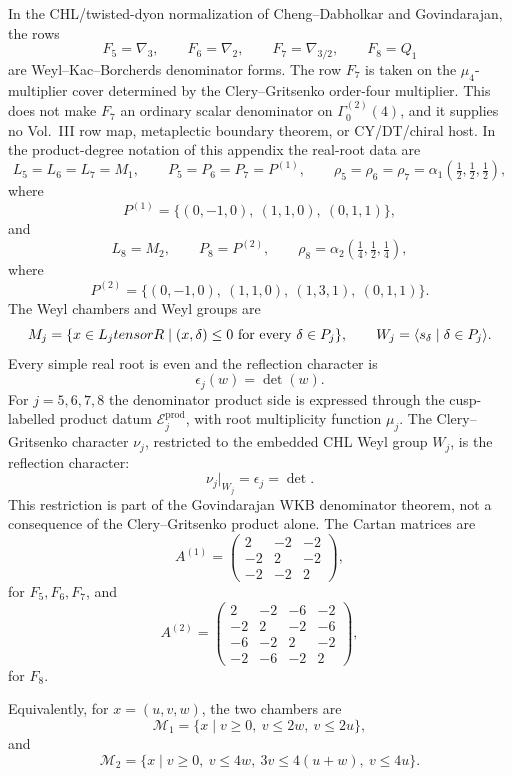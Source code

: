 \documentclass[11pt]{memoir}
\newcommand{\R}{\mathbb{R}} \newcommand{\La}{\Lambda}
\begin{document}
\begin{theorem}
\label{thm:govindarajan-denominator-rows}
In the CHL/twisted-dyon normalization of Cheng--Dabholkar and
Govindarajan, the rows
$$
F_5=\nabla_3,\qquad F_6=\nabla_2,\qquad
F_7=\nabla_{3/2},\qquad F_8=Q_1
$$
are Weyl--Kac--Borcherds denominator forms.  The row $F_7$ is taken on
the $\mu_4$-multiplier cover determined by the Clery--Gritsenko
order-four multiplier.  This does not make $F_7$ an ordinary scalar
denominator on $\Gamma_0^{(2)}(4)$, and it supplies no Vol.~III row map,
metaplectic boundary theorem, or CY/DT/chiral host.  In the
product-degree notation of this appendix the real-root data are
$$
L_5=L_6=L_7=M_1,\qquad
P_5=P_6=P_7=P^{(1)},\qquad
\rho_5=\rho_6=\rho_7=\alpha_1(\tfrac12,\tfrac12,\tfrac12),
$$
where
$$
P^{(1)}=\{(0,-1,0),\ (1,1,0),\ (0,1,1)\},
$$
and
$$
L_8=M_2,\qquad
P_8=P^{(2)},\qquad
\rho_8=\alpha_2(\tfrac14,\tfrac12,\tfrac14),
$$
where
$$
P^{(2)}=\{(0,-1,0),\ (1,1,0),\ (1,3,1),\ (0,1,1)\}.
$$
The Weyl chambers and Weyl groups are
$$
\mathcal M_j=\{x\in L_j\otimes\R\mid (x,\delta)\le0
\hbox{ for every }\delta\in P_j\},
\qquad
W_j=\langle s_\delta\mid\delta\in P_j\rangle.
$$
Every simple real root is even and the reflection character is
$$\epsilon_j(w)=\det(w).$$
For $j=5,6,7,8$ the denominator product side is expressed through the
cusp-labelled product datum $\mathscr E_j^{\mathrm{prod}}$, with root
multiplicity function $\mu_j$.
The Clery--Gritsenko character $\nu_j$, restricted to the embedded CHL
Weyl group $W_j$, is the reflection character:
$$
\nu_j|_{W_j}=\epsilon_j=\det.
$$
This restriction is part of the Govindarajan WKB denominator theorem,
not a consequence of the Clery--Gritsenko product alone.
The Cartan matrices are
$$
A^{(1)}=\left(\begin{array}{rrr}
2&-2&-2\\
-2&2&-2\\
-2&-2&2
\end{array}\right),
$$
for $F_5,F_6,F_7$, and
$$
A^{(2)}=\left(\begin{array}{rrrr}
2&-2&-6&-2\\
-2&2&-2&-6\\
-6&-2&2&-2\\
-2&-6&-2&2
\end{array}\right),
$$
for $F_8$.

Equivalently, for \(x=(u,v,w)\), the two chambers are
$$
\mathcal M_1=\{x\mid v\ge0,\ v\le2w,\ v\le2u\},
$$
and
$$
\mathcal M_2=\{x\mid v\ge0,\ v\le4w,\ 3v\le4(u+w),\ v\le4u\}.
$$


\end{theorem}
\end{document}
